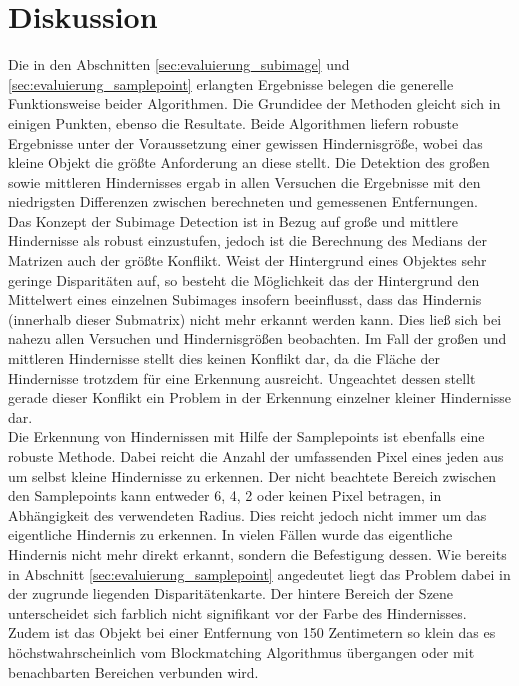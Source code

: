 \section{Diskussion}
\label{sec:evaluation_Diskussion}

Die in den Abschnitten \ref{sec:evaluierung_subimage} und \ref{sec:evaluierung_samplepoint} erlangten Ergebnisse belegen die generelle Funktionsweise beider Algorithmen. Die Grundidee der Methoden gleicht sich in einigen Punkten, ebenso die Resultate. Beide Algorithmen liefern robuste Ergebnisse unter der Voraussetzung einer gewissen Hindernisgröße, wobei das kleine Objekt die größte Anforderung an diese stellt. Die Detektion des großen sowie mittleren Hindernisses ergab in allen Versuchen die Ergebnisse mit den niedrigsten Differenzen zwischen berechneten und gemessenen Entfernungen.\\

\noindent
Das Konzept der Subimage Detection ist in Bezug auf große und mittlere Hindernisse als robust einzustufen, jedoch ist die Berechnung des Medians der Matrizen auch der größte Konflikt. Weist der Hintergrund eines Objektes sehr geringe Disparitäten auf, so besteht die Möglichkeit das der Hintergrund den Mittelwert eines einzelnen Subimages insofern beeinflusst, dass das Hindernis (innerhalb dieser Submatrix) nicht mehr erkannt werden kann. Dies ließ sich bei nahezu allen Versuchen und Hindernisgrößen beobachten. Im Fall der großen und mittleren Hindernisse stellt dies keinen Konflikt dar, da die Fläche der Hindernisse trotzdem für eine Erkennung ausreicht. Ungeachtet dessen stellt gerade dieser Konflikt ein Problem in der Erkennung einzelner kleiner Hindernisse dar.\\

\noindent
Die Erkennung von Hindernissen mit Hilfe der Samplepoints ist ebenfalls eine robuste Methode. Dabei reicht die Anzahl der umfassenden Pixel eines jeden aus um selbst kleine Hindernisse zu erkennen. Der nicht beachtete Bereich zwischen den Samplepoints kann entweder 6, 4, 2 oder keinen Pixel betragen, in Abhängigkeit des verwendeten Radius. Dies reicht jedoch nicht immer um das eigentliche Hindernis zu erkennen. In vielen Fällen wurde das eigentliche Hindernis nicht mehr direkt erkannt, sondern die Befestigung dessen. Wie bereits in Abschnitt \ref{sec:evaluierung_samplepoint} angedeutet liegt das Problem dabei in der zugrunde liegenden Disparitätenkarte. Der hintere Bereich der Szene unterscheidet sich farblich nicht signifikant vor der Farbe des Hindernisses. Zudem ist das Objekt bei einer Entfernung von 150 Zentimetern so klein das es höchstwahrscheinlich vom Blockmatching Algorithmus übergangen oder mit benachbarten Bereichen verbunden wird.\\

